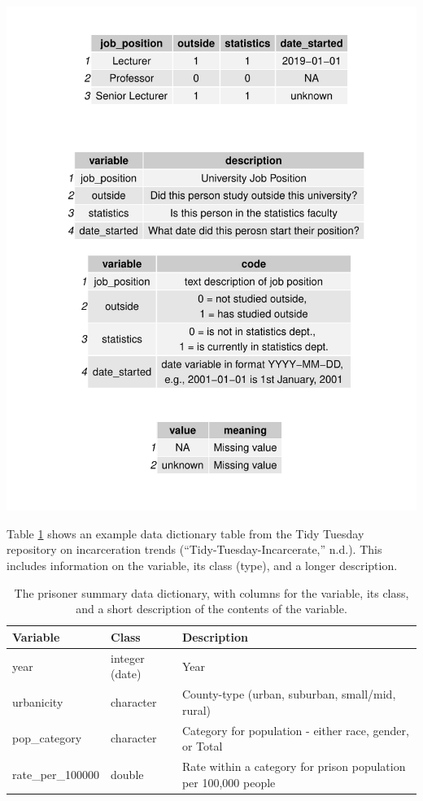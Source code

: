 \documentclass[
]{article}
\let\origfigure\figure
\let\endorigfigure\endfigure
\renewenvironment{figure}[1][2] {
    \expandafter\origfigure\expandafter[H]
} {
    \endorigfigure
}
\begin{document}
\begin{figure}
\includegraphics[width=1\linewidth]{paper_files/figure-latex/variables-1} \caption{Four tables - the data, and it's variable names, variable codes, and the meaning of missing values}\label{fig:variables}
\end{figure}

Table \ref{tab:table-data-incarcerate} shows an example data dictionary table from the Tidy Tuesday repository on incarceration trends (``Tidy-Tuesday-Incarcerate,'' n.d.). This includes information on the variable, its class (type), and a longer description.

\begin{table}[!h]

\caption{\label{tab:table-data-incarcerate}The prisoner summary data dictionary, with columns for the variable, its class, and a short description of the contents of the variable.}
\centering
\begin{tabular}[t]{lll}
\toprule
Variable & Class & Description\\
\midrule
year & integer (date) & Year\\
urbanicity & character & County-type (urban, suburban, small/mid, rural)\\
pop\_category & character & Category for population - either race, gender, or Total\\
rate\_per\_100000 & double & Rate within a category for prison population per 100,000 people\\
\bottomrule
\end{tabular}
\end{table}
\end{document}
